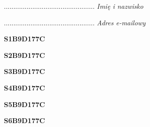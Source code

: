 \begin{turn}{90}\begin{minipage}{\linewidth} \vspace{20mm} ................................................  \textit{Imię i nazwisko}\end{minipage}\end{turn}

\begin{turn}{90}\begin{minipage}{\linewidth} \vspace{20mm} ................................................  \textit{Adres e-mailowy}\end{minipage}\end{turn}

\begin{turn}{90}\huge \begin{minipage}{\linewidth} \vspace{10mm}\textbf{S1B9D177C}\end{minipage}\end{turn}

\begin{turn}{90}\huge \begin{minipage}{\linewidth} \vspace{10mm}\textbf{S2B9D177C}\end{minipage}\end{turn}

\begin{turn}{90}\huge \begin{minipage}{\linewidth} \vspace{10mm}\textbf{S3B9D177C}\end{minipage}\end{turn}

\begin{turn}{90}\huge \begin{minipage}{\linewidth} \vspace{10mm}\textbf{S4B9D177C}\end{minipage}\end{turn}

\begin{turn}{90}\huge \begin{minipage}{\linewidth} \vspace{10mm}\textbf{S5B9D177C}\end{minipage}\end{turn}

\begin{turn}{90}\huge \begin{minipage}{\linewidth} \vspace{10mm}\textbf{S6B9D177C}\end{minipage}\end{turn}

